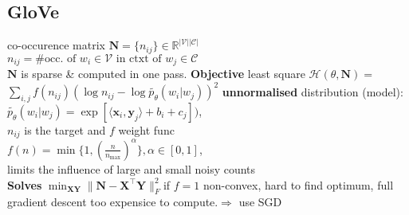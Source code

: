  \subsection*{GloVe}
co-occurence matrix $\mathbf{N}{=}\{n_{ij}\}{\in}\mathbb{R}^{|\mathcal{V}||\mathcal{C}|}$\\
 $n_{ij}{=}\text{\# occ. of }w_i{\in}\mathcal{V}\text{ in ctxt of }w_j{\in}\mathcal{C}$\\
 $\mathbf{N}$ is sparse \& computed in one pass.
 \textbf{Objective} least square $\mathcal{H}(\theta, \mathbf{N})=$\\
 $\sum_{i,j}f(n_{ij})(\log n_{ij}{-}\log \tilde{p_\theta}(w_i|w_j))^2$
 \textbf{unnormalised} distribution (model):\\
 $\tilde{p_\theta}(w_i|w_j){=}\exp[\langle\mathbf{x}_i,\mathbf{y}_j\rangle{+}b_i{+}c_j])$,\\
$n_{ij}$ is the target and $f$ weight func\\
$f(n){=}\min\{1, (\frac{n}{n_{\max}})^\alpha\}, \alpha{\in}[0,1]$, \\
limits the influence of large and small noisy counts\\
\textbf{Solves} $\min_{\mathbf{X}\mathbf{Y}}\|\mathbf{N}{-}\mathbf{X}^\top\mathbf{Y}\|_F^2$if $f{=}1$
 non-convex, hard to find optimum, full gradient descent too expensice to compute.$\Rightarrow$ use SGD